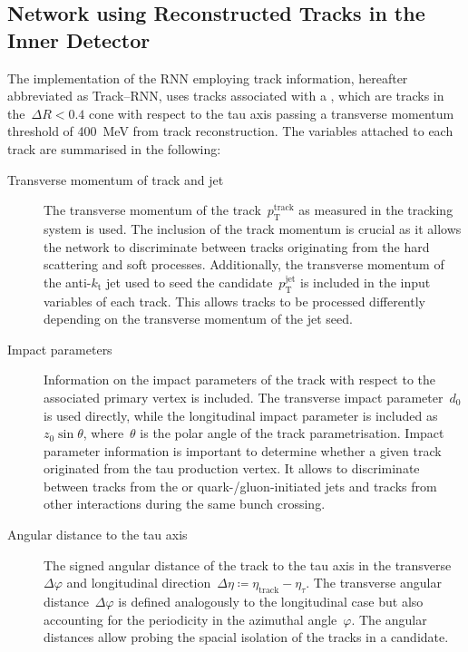 \subsection{Network using Reconstructed Tracks in the Inner Detector}
\label{sec:rnn_tracks}

The implementation of the RNN employing track information, hereafter abbreviated
as Track--RNN, uses tracks associated with a \tauhadvis, which are tracks in
the~$\Delta R < 0.4$ cone with respect to the tau axis passing a transverse
momentum threshold of \SI{400}{\MeV} from track reconstruction. The variables
attached to each track are summarised in the following:
\begin{description}
\item[Transverse momentum of track and jet] The transverse momentum of the
  track~$p_\text{T}^\text{track}$ as measured in the tracking system is used.
  The inclusion of the track momentum is crucial as it allows the network to
  discriminate between tracks originating from the hard scattering and soft
  processes. Additionally, the transverse momentum of the anti-$k_\text{t}$ jet
  used to seed the \tauhadvis candidate~$p_\text{T}^\text{jet}$ is included in
  the input variables of each track. This allows tracks to be processed
  differently depending on the transverse momentum of the jet seed.

\item[Impact parameters] Information on the impact parameters of the track with
  respect to the associated primary vertex is included. The transverse impact
  parameter~$d_0$ is used directly, while the longitudinal impact parameter is
  included as~$z_0 \sin\theta$, where~$\theta$ is the polar angle of the track
  parametrisation.
  Impact parameter information is important to determine whether a given track
  originated from the tau production vertex. It allows to discriminate between
  tracks from the \tauhad or quark-/gluon-initiated jets and tracks from other
  interactions during the same bunch crossing.

\item[Angular distance to the tau axis] The signed angular distance of the track
  to the tau axis in the transverse~$\Delta \varphi$ and longitudinal
  direction~$\Delta \eta \coloneqq \eta_\text{track} - \eta_\tau$. The transverse
  angular distance~$\Delta \varphi$ is defined analogously to the longitudinal
  case but also accounting for the periodicity in the azimuthal angle~$\varphi$.
  The angular distances allow probing the spacial isolation of the tracks in a
  \tauhadvis candidate.


\end{description}
